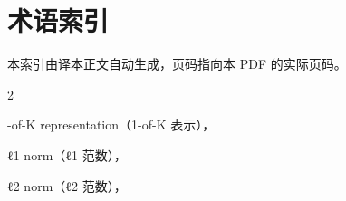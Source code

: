 \chapter*{术语索引}

本索引由译本正文自动生成，页码指向本 PDF 的实际页码。

\begin{multicols}{2}\small

\medskip\noindent{\hei #}\par\smallskip
{}-of-K representation（1-of-K 表示），\par

\medskip{}\par\smallskip
\noindent ℓ1 norm（ℓ1 范数），\par
\noindent ℓ2 norm（ℓ2 范数），\par


\end{multicols}
